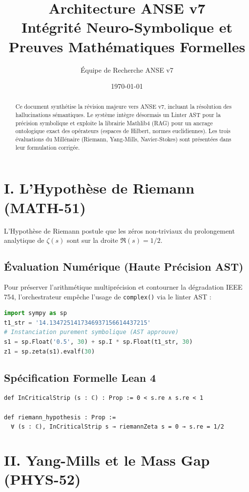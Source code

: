 \documentclass[11pt, a4paper]{article}
\title{\textbf{Architecture ANSE v7}\\ \Large Intégrité Neuro-Symbolique et Preuves Mathématiques Formelles}
\author{Équipe de Recherche ANSE v7}
\date{\today}
\begin{document}
\maketitle

\begin{abstract}
Ce document synthétise la révision majeure vers ANSE v7, incluant la résolution des hallucinations sémantiques. Le système intègre désormais un Linter AST pour la précision symbolique et exploite la librairie Mathlib4 (RAG) pour un ancrage ontologique exact des opérateurs (espaces de Hilbert, normes euclidiennes). Les trois évaluations du Millénaire (Riemann, Yang-Mills, Navier-Stokes) sont présentées dans leur formulation corrigée.
\end{abstract}

\section{I. L'Hypothèse de Riemann (MATH-51)}
L'Hypothèse de Riemann postule que les zéros non-triviaux du prolongement analytique de $\zeta(s)$ sont sur la droite $\Re(s) = 1/2$.
\subsection{Évaluation Numérique (Haute Précision AST)}
Pour préserver l'arithmétique multiprécision et contourner la dégradation IEEE 754, l'orchestrateur empêche l'usage de \texttt{complex()} via le linter AST :
\begin{lstlisting}[language=Python]
import sympy as sp
t1_str = '14.1347251417346937156614437215'
# Instanciation purement symbolique (AST approuve)
s1 = sp.Float('0.5', 30) + sp.I * sp.Float(t1_str, 30)
z1 = sp.zeta(s1).evalf(30)
\end{lstlisting}
\subsection{Spécification Formelle Lean 4}
\begin{lstlisting}[language=Lean]
def InCriticalStrip (s : ℂ) : Prop := 0 < s.re ∧ s.re < 1

def riemann_hypothesis : Prop :=
  ∀ (s : ℂ), InCriticalStrip s → riemannZeta s = 0 → s.re = 1/2
\end{lstlisting}

\section{II. Yang-Mills et le Mass Gap (PHYS-52)}
\end{document}
